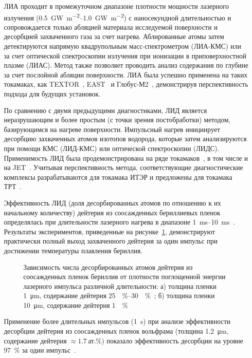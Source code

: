 ЛИА проходит в промежуточном диапазоне плотности мощности лазерного излучения (\SIrange{0.5}{1.0}{\giga\watt\per\meter\squared}) с наносекундной длительностью и сопровождается только абляцией материала исследуемой поверхности и десорбцией захваченного газа за счет нагрева. Аблированные атомы затем детектируются напрямую квадрупольным масс-спектрометром (ЛИА-КМС) или за счет оптической спектроскопии излучения при ионизации в приповерхностной плазме (ЛИАС). Метод также позволяет проводить анализ содержания по глубине за счет послойной абляции поверхности. ЛИА была успешно применена на таких токамаках, как TEXTOR~\cite{Gierse2016}, EAST~\cite{Hu2018} и Глобус-М2~\cite{Medvedev2024}, демонстрируя перспективность подхода для будущих установок. 

По сравнению с двумя предыдущими диагностиками, ЛИД является неразрушающим и более простым (с точки зрения постобработки) методом, базирующимся на нагреве поверхности. Импульсный нагрев инициирует десорбцию захваченных атомов изотопов водорода, которые затем анализируются при помощи КМС (ЛИД-КМС) или оптической спектроскопии (ЛИДС). Применимость ЛИД была продемонстрирована на ряде токамаков~\cite{Schweer2009, Medvedev2024}, в том числе и на JET~\cite{Zlobinski2024}. Учитывая перспективность метода, соответствующие диагностические комплексы разрабатываются для токамака ИТЭР и предложены для токамака ТРТ~\cite{Razdobarin2022}. 

Эффективность ЛИД (доля десорбированных атомов по отношению к их начальному количеству) дейтерия из соосажденных бериллиевых пленок определялась при длительности лазерного нагрева в диапазоне \SIrange{1}{10}{\milli\second}~\cite{Zlobinski2019, Zlobinski2020}. Результаты экспериментов, приведенные на рисунке~\cref{fig:ch1/LID_efficiency}, демонстрируют практически полный выход захваченного дейтерия за один импульс при достижении температуры плавления бериллия. 
\begin{figure}[ht]
    \caption{Зависимость числа десорбированных атомов дейтерия из соосажденных пленок бериллия от плотности поглощенной энергии лазерного импульса различной длительности: а) толщина пленки \SI{1}{\micro\meter}, содержание дейтерия \SIrange{25}{30}{\percent}~\cite{Zlobinski2019}; б) толщина пленки \SI{10}{\micro\meter}, содержание дейтерия \SI{1}{\percent}~\cite{Zlobinski2020}}\label{fig:ch1/LID_efficiency}
\end{figure}
Применение более длительных импульсов (\SI{1}{\second}) при анализе эффективности десорбции дейтерия из соосажденных пленок вольфрама (толщина \SI{1.2}{\micro\meter}, содержание дейтерия \( \approx \SI{1.7}{\text{ат.}\percent} \)) показало эффективность десорбции на уровне \SI{97}{\percent} за один импульс~\cite{Yu2019}.

